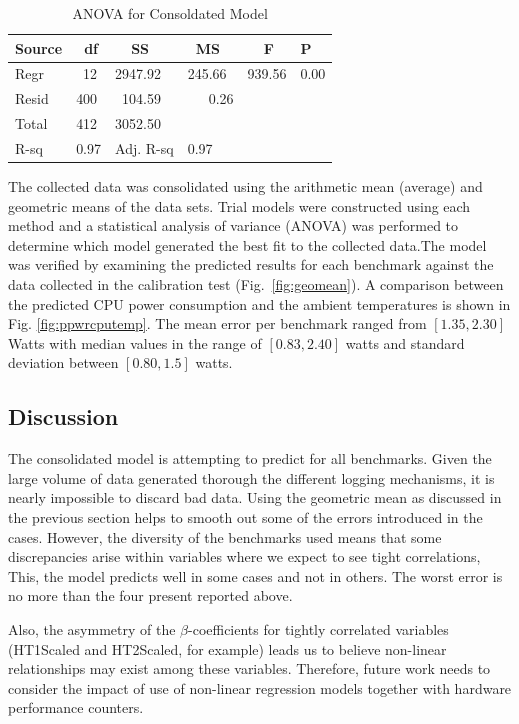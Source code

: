 \documentclass[times, 10pt, finalversion]{usetex-v1}
\begin{document}
\begin{small}
\begin{table}[tbph]
  \centering
  \caption{ANOVA for Consoldated Model}
  \label{tab:anova}
  \begin{tabular}{llllll}
    \hline
    Source&~df&~~SS&~MS&~~F&P\\
    \hline
    Regr &~12&2947.92&245.66&939.56&  0.00\\
    Resid&400&~104.59&~~~0.26&&\\
    Total&412&3052.50&&\\
    \hline
    R-sq&0.97&Adj. R-sq&0.97&&\\
    \hline \hline
  \end{tabular}
\end{table}
\end{small}

The collected data was consolidated using the arithmetic mean (average)
and geometric means of the data sets.  Trial models were constructed
using each method and a statistical analysis of variance (ANOVA) was
performed to determine which model generated the best fit to the
collected data.The model was verified by examining the predicted results
for each benchmark against the data collected in the calibration test
(Fig.~\ref{fig:geomean}). A comparison between the predicted CPU power
consumption and the ambient temperatures is shown in
Fig. \ref{fig:ppwrcputemp}. The mean error per benchmark ranged from
$[1.35,2.30]$ Watts with median values in the range of $[0.83,2.40]$
watts and standard deviation between $[0.80,1.5]$ watts.

\subsection{Discussion}
\label{sec:discussions}
The consolidated model is attempting to predict for all
benchmarks. Given the large volume of data generated thorough
the different logging mechanisms, it is nearly impossible to discard bad
data.  Using the geometric mean as discussed in the previous section
helps to smooth out some of the errors introduced in the cases. However,
the diversity of the benchmarks used means that some discrepancies arise
within variables where  we expect to see tight correlations,  This, the
model predicts well in some cases and not in others.  The worst error is
no more than the four present reported above.

Also, the asymmetry of the $\beta$-coefficients for tightly correlated
variables (HT1Scaled and HT2Scaled, for example) leads us to believe
non-linear relationships may exist among these variables. Therefore,
future work needs to consider the impact of use of  non-linear
regression models together with hardware performance counters.
\end{document}
